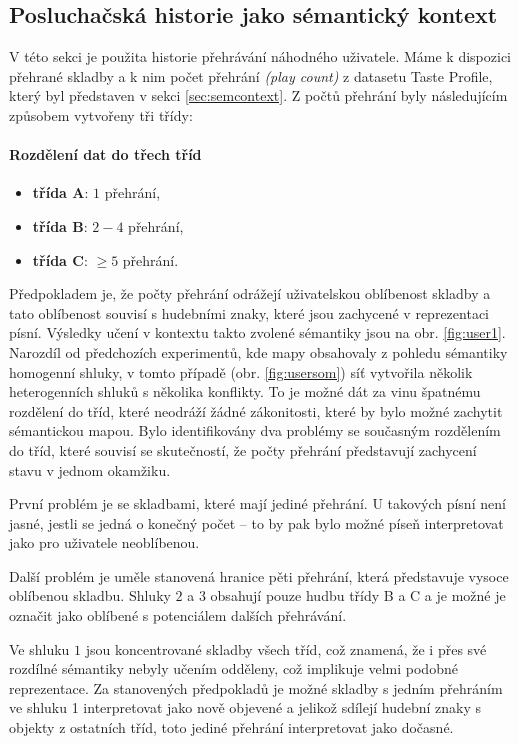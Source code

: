 \documentclass[thesis=M,czech]{FITthesis}[2012/06/26]
\begin{document}
\subsection{Posluchačská historie jako sémantický kontext}
V této sekci je použita historie přehrávání náhodného uživatele. Máme k dispozici přehrané skladby a k nim počet přehrání \textit{(play count)} z datasetu Taste Profile, který byl představen v sekci \ref{sec:semcontext}. Z počtů přehrání byly následujícím způsobem vytvořeny tři třídy:

\paragraph{Rozdělení dat do třech tříd}
\begin{itemize}
\item \textbf{třída A}: $1$ přehrání,
\item  \textbf{třída B}: $2-4$ přehrání,
\item  \textbf{třída C}: $\geq5$ přehrání.
\end{itemize}



Předpokladem je, že počty přehrání odrážejí uživatelskou oblíbenost skladby a tato oblíbenost souvisí s hudebními znaky, které jsou zachycené v reprezentaci písní. Výsledky učení v kontextu takto zvolené sémantiky jsou na obr. \ref{fig:user1}. Narozdíl od předchozích experimentů, kde mapy obsahovaly z pohledu sémantiky homogenní shluky, v tomto případě (obr. \ref{fig:usersom}) síť vytvořila několik heterogenních shluků s několika konflikty. To je možné dát za vinu špatnému rozdělení do tříd, které neodráží žádné zákonitosti, které by bylo možné zachytit sémantickou mapou. Bylo identifikovány dva problémy se současným rozdělením do tříd, které souvisí se skutečností, že počty přehrání představují zachycení stavu v jednom okamžiku.


První problém je se skladbami, které mají jediné přehrání. U takových písní není jasné, jestli se jedná o konečný počet -- to by pak bylo možné píseň interpretovat jako pro uživatele neoblíbenou. 

Další problém je uměle stanovená hranice pěti přehrání, která představuje vysoce oblíbenou skladbu. Shluky $2$ a $3$ obsahují pouze hudbu třídy B a C a je možné je označit jako oblíbené s potenciálem dalších přehrávání.

Ve shluku $1$ jsou koncentrované skladby všech tříd, což znamená, že i přes své rozdílné sémantiky nebyly učením odděleny, což implikuje  velmi podobné reprezentace. Za stanovených předpokladů je možné skladby s jedním přehráním ve shluku 1 interpretovat jako nově objevené a jelikož sdílejí hudební znaky s objekty z ostatních tříd, toto jediné přehrání interpretovat jako dočasné.
\end{document}
